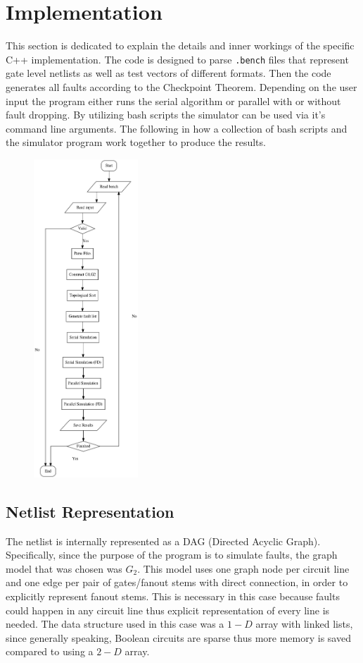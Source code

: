 \documentclass[a4paper,12pt]{article}
\begin{document}
\clearpage

\section*{Implementation}
This section is dedicated to explain the details and inner workings of the specific C++ implementation. The code is designed to parse \texttt{.bench} files that represent gate level netlists as well as test vectors of different formats. Then the code generates all faults according to the Checkpoint Theorem. Depending on the user input the program either runs the serial algorithm or parallel with or without fault dropping. By utilizing bash scripts the simulator can be used via it's command line arguments. The following in how a collection of bash scripts and the simulator program work together to produce the results.

\begin{figure}[h]  
  \centering
    \includegraphics[width=0.35\textwidth]{Diagram.png}
\end{figure}

\clearpage
\subsection*{Netlist Representation}
The netlist is internally represented as a DAG (Directed Acyclic Graph). Specifically, since the purpose of the program is to simulate faults, the graph model that was chosen was $G_2$. This model uses one graph node per circuit line and one edge per pair of gates/fanout stems with direct connection, in order to explicitly represent fanout stems. This is necessary in this case because faults could happen in any circuit line thus explicit representation of every line is needed. The data structure used in this case was a $1-D$ array with linked lists, since generally speaking, Boolean circuits are sparse thus more memory is saved compared to using a $2-D$ array. 
\end{document}
